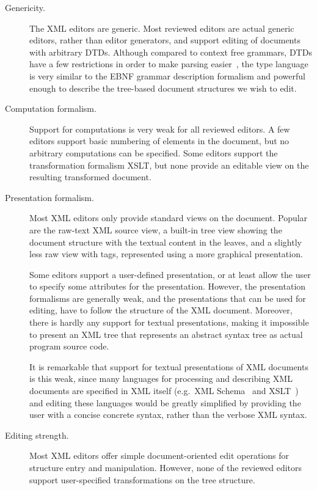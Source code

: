 \begin{description}
\item[Genericity.] 
The XML editors are generic. Most reviewed editors are actual generic editors, rather than editor generators, and support editing of documents with arbitrary DTDs. Although compared to context free grammars, DTDs have a few restrictions in order to make parsing easier~\cite{klein98glushkovRestr}, the type language is very similar to the EBNF grammar description formalism and powerful enough to describe the tree-based document structures we wish to edit.

\item[Computation formalism.]
Support for computations is very weak for all reviewed editors. A few editors support basic numbering of elements in the document, but no arbitrary computations can be specified. Some editors support the transformation formalism XSLT, but none provide an editable view on the resulting transformed document.

\item[Presentation formalism.]
Most XML editors only provide standard views on the document. Popular are the raw-text XML source view, a built-in tree view showing the document structure with the textual content in the leaves, and a slightly less raw view with tags, represented using a more graphical presentation.

Some editors support a user-defined presentation, or at least allow the user to specify some attributes for the presentation. However, the presentation formalisms are generally weak, and the presentations that can be used for editing, have to follow the structure of the XML document. Moreover, there is hardly any support for textual presentations, making it impossible to present an XML tree that represents an abstract syntax tree as actual program source code.

It is remarkable that support for textual presentations of XML documents is this weak, since many languages for processing and describing XML documents are specified in XML itself (e.g.\ XML Schema~\cite{xmlSchema1, xmlSchema2}  and XSLT~\cite{xslt10}) and editing these languages would be greatly simplified by providing the user with a concise concrete syntax, rather than the verbose XML syntax.

\item[Editing strength.]
Most XML editors offer simple document-oriented edit operations for structure entry and manipulation. However, none of the reviewed editors support user-specified transformations on the tree structure.


\end{description}
